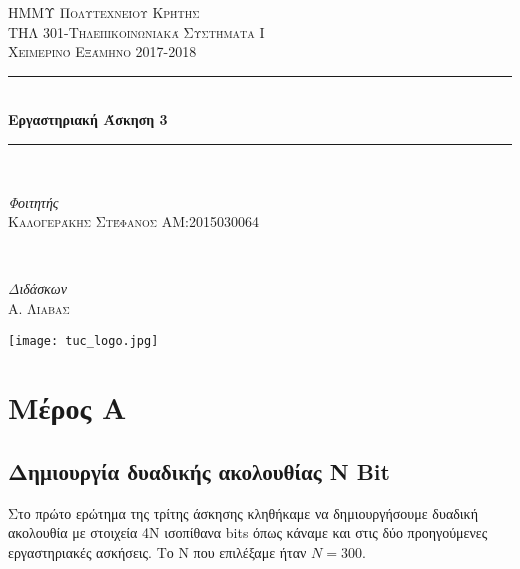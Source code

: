 \documentclass[11pt]{article}
\newcommand{\HRule}{\rule{\linewidth}{0.5mm}}
\newcommand{\np}{\newpage}	%
\begin{document}
\begin{titlepage}
	\begin{center}
	\textsc{\LARGE ΗΜΜΥ Πολυτεχνείου Κρήτης}\\[1.5cm]
	
	\textsc{\Large ΤΗΛ 301-Τηλεπικοινωνιακά Συστήματα Ι}\\[0.5cm] 
	
	\textsc{\large Χειμερινό Εξάμηνο 2017-2018}\\[0.5cm]
	
	\HRule\\[0.45cm]
	\huge{\bfseries Εργαστηριακή Άσκηση 3}\\
	[2mm]
	\HRule\\[1.5cm]
	
	\begin{minipage}{0.4\textwidth}
		\begin{flushleft}
			\large
			\textit{Φοιτητής}\\
			\textsc{Καλογεράκης Στέφανος}
			\textsc{ΑΜ:2015030064}
		\end{flushleft}
	\end{minipage}
	~
	\begin{minipage}{0.4\textwidth}
		\begin{flushright}
			\large
			\textit{Διδάσκων}\\
			\textsc{Α. Λιαβας} %
		\end{flushright}
	\end{minipage}
	
	\vfill
    \texttt{[image: tuc\_logo.jpg]} %
    \vfill
    
	\end{center}
\end{titlepage}


\thispagestyle{empty}
\np
\tableofcontents
\np

\section{Μέρος Α}
\subsection{Δημιουργία δυαδικής ακολουθίας \foreignlanguage{english}{N Bit}}
Στο πρώτο ερώτημα της τρίτης άσκησης κληθήκαμε να δημιουργήσουμε δυαδική ακολουθία με στοιχεία 4Ν ισοπίθανα \foreignlanguage{english}{bits} όπως κάναμε και στις δύο προηγούμενες εργαστηριακές ασκήσεις. Το Ν που επιλέξαμε ήταν $Ν=300$.
\end{document}
